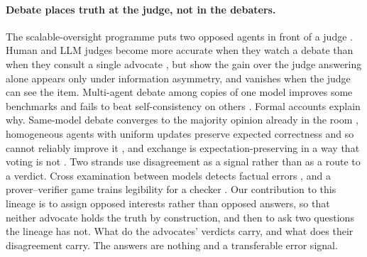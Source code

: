 \paragraph{Debate places truth at the judge, not in the debaters.}
The scalable-oversight programme puts two opposed agents in front of a judge
\citep{irving18}. Human and LLM judges become more accurate when they watch
a debate than when they consult a single advocate
\citep{michael2023debate,khan2024debating}, but \citet{kenton2024scalable}
show the gain over the judge answering alone appears only under information
asymmetry, and vanishes when the judge can see the item. Multi-agent debate
among copies of one model improves some benchmarks
\citep{du23,liang2024divergent,chan2023chateval} and fails to beat
self-consistency on others \citep{smit2024mad,wang2024rethinking}. Formal
accounts explain why. Same-model debate converges to the majority opinion
already in the room \citep{estornell2024multillm}, homogeneous agents with
uniform updates preserve expected correctness and so cannot reliably improve
it \citep{zhu2026demystifying}, and exchange is expectation-preserving in a
way that voting is not \citep{choi2025debateorvote}. Two strands use
disagreement as a signal rather than as a route to a verdict. Cross
examination between models detects factual errors \citep{cohen2023lmvslm},
and a prover--verifier game trains legibility for a checker
\citep{kirchner2024prover}. Our contribution to this lineage is to assign
opposed interests rather than opposed answers, so that neither advocate holds
the truth by construction, and then to ask two questions the lineage has
not. What do the advocates' verdicts carry, and what does their disagreement
carry. The answers are nothing and a transferable error signal.

